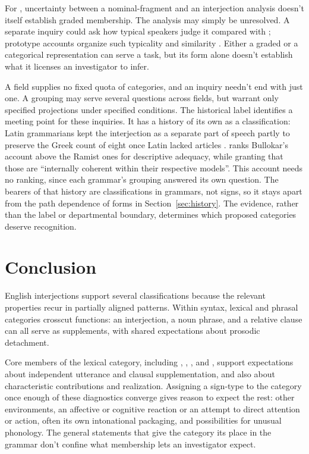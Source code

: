 \documentclass[12pt]{article}
\begin{document}
For , uncertainty between a nominal-fragment and an
interjection analysis doesn't itself establish graded membership. The
analysis may simply be unresolved. A separate inquiry could ask how
typical speakers judge it compared with ; prototype
accounts organize such typicality and similarity \citep{rosch1975,taylor2003}.
Either a graded or a categorical representation can serve a task,
but its form alone doesn't establish what it licenses an investigator
to infer.

A field supplies no fixed quota of categories, and an inquiry
needn't end with just one. A grouping may serve several questions across
fields, but warrant only specified projections under specified conditions.
The historical label  identifies a meeting point for
these inquiries. It has a history of its own as a classification: Latin
grammarians kept the interjection as a separate part of speech partly to
preserve the Greek count of eight once Latin lacked articles
\citep[479]{bagli2026}. \textcite[487--488]{bagli2026} ranks Bullokar's
account above the Ramist ones for descriptive adequacy, while granting
that those are \enquote{internally coherent within their respective
models}. This account needs no ranking, since each
grammar's grouping answered its own question. The bearers of that
history are classifications in grammars, not signs, so it stays apart
from the path dependence of forms in Section~\ref{sec:history}. The evidence, rather than the label or departmental
boundary, determines which proposed categories deserve recognition.

\section{Conclusion}\label{sec:conclusion}

English interjections support several classifications because the relevant
properties recur in partially aligned patterns. Within syntax, lexical
and phrasal categories crosscut functions: an interjection, a noun phrase,
and a relative clause can all serve as supplements, with shared
expectations about prosodic detachment.

Core members of the lexical category, including ,
, , and , support expectations
about independent utterance and clausal supplementation, and also about
characteristic contributions and realization. Assigning a sign-type to the
category once enough of these diagnostics converge gives reason to expect
the rest: other environments, an affective or cognitive reaction
or an attempt to direct attention or action, often its own intonational
packaging, and possibilities for unusual phonology.
The general statements that give the category its place in the grammar
don't confine what membership lets an investigator expect.
\end{document}
